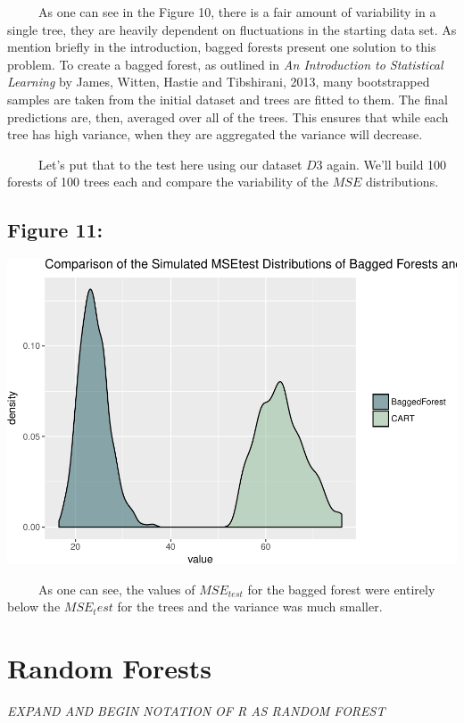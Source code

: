 \documentclass[12pt,twoside]{reedthesis}
\begin{document}
  ~~~~~As one can see in the Figure 10, there is a fair amount of
  variability in a single tree, they are heavily dependent on fluctuations
  in the starting data set. As mention briefly in the introduction, bagged
  forests present one solution to this problem. To create a bagged forest,
  as outlined in \emph{An Introduction to Statistical Learning} by James,
  Witten, Hastie and Tibshirani, 2013, many bootstrapped samples are taken
  from the initial dataset and trees are fitted to them. The final
  predictions are, then, averaged over all of the trees. This ensures that
  while each tree has high variance, when they are aggregated the variance
  will decrease.
  
  ~~~~~Let's put that to the test here using our dataset \(D3\) again.
  We'll build 100 forests of 100 trees each and compare the variability of
  the \(MSE\) distributions.
  
  \subsection{Figure 11:}\label{figure-11}
  
  \includegraphics{Thesis_files/figure-latex/fig11-1.pdf}
  
  ~~~~~As one can see, the values of \(MSE_{test}\) for the bagged forest
  were entirely below the \(MSE_test\) for the trees and the variance was
  much smaller.
  
  \section{Random Forests}\label{random-forests}
  
  \emph{EXPAND AND BEGIN NOTATION OF R AS RANDOM FOREST}
  
\end{document}
